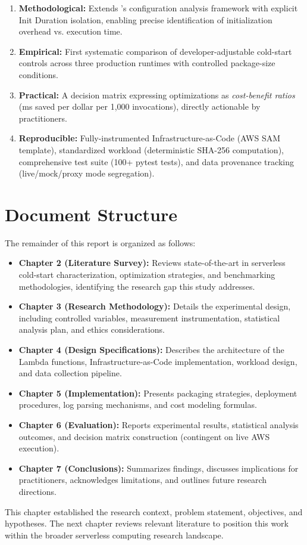 \begin{enumerate}
    \item \textbf{Methodological:} Extends \citet{bluemke2025ijet}'s configuration analysis framework with explicit Init Duration isolation, enabling precise identification of initialization overhead vs. execution time.
    
    \item \textbf{Empirical:} First systematic comparison of developer-adjustable cold-start controls across three production runtimes with controlled package-size conditions.
    
    \item \textbf{Practical:} A decision matrix expressing optimizations as \textit{cost-benefit ratios} (ms saved per dollar per 1,000 invocations), directly actionable by practitioners.
    
    \item \textbf{Reproducible:} Fully-instrumented Infrastructure-as-Code (AWS SAM template), standardized workload (deterministic SHA-256 computation), comprehensive test suite (100+ pytest tests), and data provenance tracking (live/mock/proxy mode segregation).
\end{enumerate}

\section{Document Structure}

The remainder of this report is organized as follows:

\begin{itemize}
    \item \textbf{Chapter 2 (Literature Survey):} Reviews state-of-the-art in serverless cold-start characterization, optimization strategies, and benchmarking methodologies, identifying the research gap this study addresses.
    
    \item \textbf{Chapter 3 (Research Methodology):} Details the experimental design, including controlled variables, measurement instrumentation, statistical analysis plan, and ethics considerations.
    
    \item \textbf{Chapter 4 (Design Specifications):} Describes the architecture of the Lambda functions, Infrastructure-as-Code implementation, workload design, and data collection pipeline.
    
    \item \textbf{Chapter 5 (Implementation):} Presents packaging strategies, deployment procedures, log parsing mechanisms, and cost modeling formulas.
    
    \item \textbf{Chapter 6 (Evaluation):} Reports experimental results, statistical analysis outcomes, and decision matrix construction (contingent on live AWS execution).
    
    \item \textbf{Chapter 7 (Conclusions):} Summarizes findings, discusses implications for practitioners, acknowledges limitations, and outlines future research directions.
\end{itemize}

This chapter established the research context, problem statement, objectives, and hypotheses. The next chapter reviews relevant literature to position this work within the broader serverless computing research landscape.